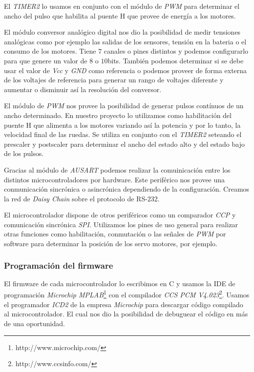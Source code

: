 El \emph{TIMER2} lo usamos en conjunto con el m\'odulo de \emph{PWM} para determinar el ancho del pulso que habilita al puente H
que provee de energ\'ia a los motores.

El m\'odulo conversor anal\'ogico digital nos dio la posibilidad de medir tensiones anal\'ogicas como por ejemplo
las salidas de los sensores, tensi\'on en la bateria o el consumo de los motores.
Tiene $7$ canales o pines distintos y podemos configurarlo para que genere un valor de $8$ o $10$bits.
Tambi\'en podemos determinar si se debe usar el valor de \emph{Vcc} y \emph{GND} como referencia o podemos proveer
de forma externa de los voltajes de referencia para generar un rango de voltajes diferente y aumentar o disminuir
as\'i la resoluci\'on del conversor.

El m\'odulo de \emph{PWM} nos provee la posibilidad de generar pulsos cont\'inuos de un ancho determinado.
En nuestro proyecto lo utilizamos como habilitaci\'on del puente H que alimenta a los motores variando as\'i la
potencia y por lo tanto, la velocidad final de las ruedas.
Se utiliza en conjunto con el \emph{TIMER2} seteando el prescaler y postscaler para determinar el ancho del
estado alto y del estado bajo de los pulsos.

Gracias al m\'odulo de \emph{AUSART} podemos realizar la comuinicaci\'on entre los distintos microcontroladores por hardware.
Este perif\'erico nos provee una conmunicaci\'on sincr\'onica o asincr\'onica dependiendo de la configuraci\'on.
Creamos la red de \emph{Daisy Chain} sobre el protocolo de RS-232.

El microcontrolador dispone de otros perif\'ericos como un comparador \emph{CCP} y comunicaci\'on sincr\'onica \emph{SPI}.
Utilizamos los pines de uso general para realizar otras funciones como habilitaci\'on, conmutaci\'on o las se\~nales de
\emph{PWM} por software para determinar la posici\'on de los servo motores, por ejemplo.

\subsubsection{Programaci\'on del firmware}
\label{h_controlador_micro_programacion}

El firmware de cada microcontrolador lo escribimos en C y usamos la IDE de programaci\'on 
\emph{Microchip MPLAB}\footnote{http://www.microchip.com/} con el compilador \emph{CCS PCM V4.023}\footnote{http://www.ccsinfo.com/}.
Usamos el programador \emph{ICD2} de la empresa \emph{Microchip} para descargar c\'odigo compilado al microcontrolador.
El cual nos dio la posibilidad de debuguear el c\'odigo en m\'as de una oportunidad.

